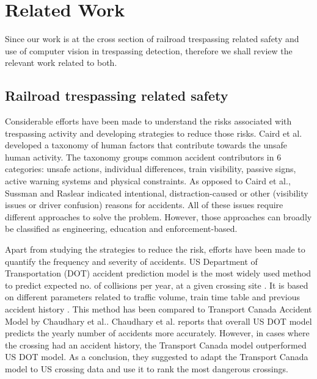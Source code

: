 \section{Related Work}
Since our work is at the cross section of railroad trespassing related safety and use of computer vision in trespassing detection, therefore we shall review the relevant work related to both. 

\subsection{Railroad trespassing related safety} Considerable efforts have been made to understand the risks associated with trespassing activity and developing strategies to reduce those risks. Caird et al.\cite{caird2002human} developed a taxonomy of human factors that contribute towards the unsafe human activity.  The taxonomy groups  common accident contributors in 6 categories: unsafe actions, individual differences, train visibility, passive signs, active warning systems and physical constraints. As opposed to Caird et al.\cite{caird2002human}, Sussman and Raslear\cite{sussman2007railroad} indicated intentional, distraction-caused or other (visibility issues or driver confusion) reasons for accidents. All of these issues require different approaches to solve the problem. However, those approaches can broadly be classified as engineering, education and enforcement-based.

Apart from studying the strategies to reduce the risk, efforts have been made to quantify the frequency and severity of accidents. US Department of Transportation (DOT) accident prediction model is the most widely used method to predict expected no. of collisions per year, at a given crossing site \cite{austin2002alternative,tustin1986railroad}. It is based on different parameters related to traffic volume, train time table and previous accident history \cite{chadwick2014highway}. This method has been compared to Transport Canada Accident Model \cite{saccomanno2003identifying} by Chaudhary et al.\cite{chaudhary2011railroad}. Chaudhary et al. reports that overall US DOT model predicts the yearly number of accidents more accurately. However, in cases where the crossing had an accident history, the Transport Canada model outperformed US DOT model. As a conclusion, they suggested to adapt the Transport Canada model to US crossing data and use it to rank the most dangerous crossings.

